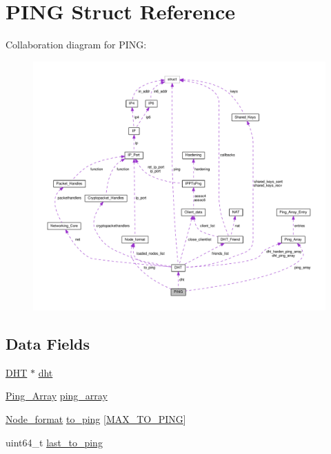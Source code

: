 \hypertarget{struct_p_i_n_g}{\section{P\+I\+N\+G Struct Reference}
\label{struct_p_i_n_g}
}


Collaboration diagram for P\+I\+N\+G\+:
\nopagebreak
\begin{figure}[H]
\begin{center}
\leavevmode
\includegraphics[width=350pt]{db/d6b/struct_p_i_n_g__coll__graph}
\end{center}
\end{figure}
\subsection*{Data Fields}
\begin{DoxyCompactItemize}
\item 
\hyperlink{struct_d_h_t}{D\+H\+T} $\ast$ \hyperlink{struct_p_i_n_g_a8b3d6ce8745acc52695e252bdb1531b6}{dht}
\item 
\hyperlink{struct_ping___array}{Ping\+\_\+\+Array} \hyperlink{struct_p_i_n_g_afb64d37a183969be553d23416dc47a4b}{ping\+\_\+array}
\item 
\hyperlink{struct_node__format}{Node\+\_\+format} \hyperlink{struct_p_i_n_g_a285072fd4cc519802afa28bef4227c57}{to\+\_\+ping} \mbox{[}\hyperlink{ping_8c_ad1ce7ca90b9952294a49754a8526efff}{M\+A\+X\+\_\+\+T\+O\+\_\+\+P\+I\+N\+G}\mbox{]}
\item 
uint64\+\_\+t \hyperlink{struct_p_i_n_g_afc22124d671081ed5b12fc2fa71801d3}{last\+\_\+to\+\_\+ping}
\end{DoxyCompactItemize}


